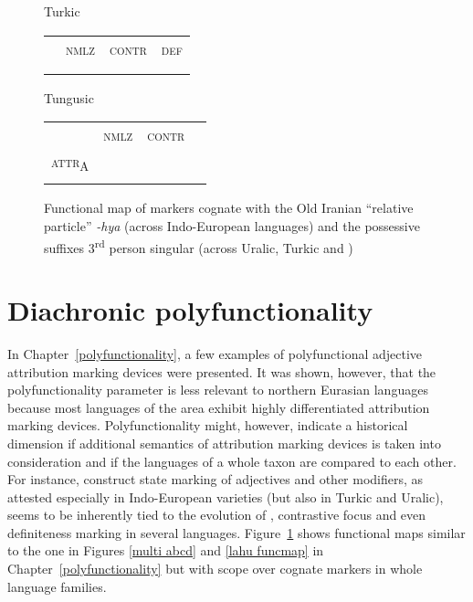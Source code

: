 {\begin{figure}
\parbox[b]{0.5\textwidth}{
\begin{center}Turkic\\
\medskip
\begin{tabular}{| m{1.4cm} || m{.9cm} | m{1.1cm} | m{.7cm} |}
\cline{1-1}
\\
\cline{1-1}
\\
\hline
 & \textsc{nmlz} & \textsc{contr} & \textsc{def}\\
\hline
\\
\cline{1-1}
\\
\cline{1-1}
\end{tabular}
\end{center}
}
\parbox[b]{0.5\textwidth}{
\begin{center}Tungusic\\
\medskip
\begin{tabular}{| m{1.4cm} || m{.9cm} | m{1.1cm} | m{.7cm} |}
\cline{1-1}
\\
\cline{1-1}
\\
\hline
 & \textsc{nmlz} & \textsc{contr} & \\
\hline
\textsc{attr}\textsubscript{A}\\
\cline{1-1}
\\
\cline{1-1}
\end{tabular}
\end{center}
}
\caption[Functional map of cognate devices]{Functional map of markers cognate with the Old Iranian “relative particle” \textit{-hya} (across Indo-European languages) and the possessive suffixes 3\textsuperscript{rd} person singular (across Uralic, Turkic and )}
\label{ie-ural funcmap}
\end{figure}

\section{Diachronic polyfunctionality}
In Chapter~\ref{polyfunctionality}, a few examples of polyfunctional adjective attribution marking devices were presented. It was shown, however, that the polyfunctionality parameter is less relevant to northern Eurasian languages because most languages of the area exhibit highly differentiated attribution marking devices. Polyfunctionality might, however, indicate a historical dimension if additional semantics of attribution marking devices is taken into consideration and if the languages of a whole taxon are compared to each other. For instance, construct state marking of adjectives and other modifiers, as attested especially in Indo-European varieties (but also in Turkic and Uralic), seems to be inherently tied to the evolution of , contrastive focus and even definiteness marking in several languages. Figure~\ref{ie-ural funcmap} shows functional maps similar to the one in Figures \ref{multi abcd} and \ref{lahu funcmap} in Chapter~\ref{polyfunctionality} but with scope over cognate markers in whole language families.

}
